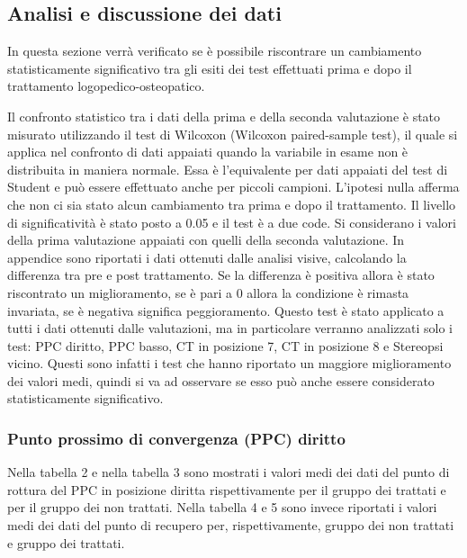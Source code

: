  
 
\subsection{Analisi e discussione dei dati}
 
In questa sezione verrà verificato se è possibile riscontrare un cambiamento statisticamente significativo tra gli esiti dei test effettuati prima e dopo il trattamento logopedico-osteopatico.
 
Il confronto statistico tra i dati della prima e della seconda valutazione è stato misurato utilizzando il test di Wilcoxon (Wilcoxon paired-sample test), il quale si applica nel confronto di dati appaiati quando la variabile in esame non è distribuita in maniera normale. Essa è l’equivalente per dati appaiati del test di Student e può essere effettuato anche per piccoli campioni. L’ipotesi nulla afferma che non ci sia stato alcun cambiamento tra prima e dopo il trattamento. Il livello di significatività è stato posto a 0.05 e il test è a due code. Si considerano i valori della prima valutazione appaiati con quelli della seconda valutazione. In appendice sono riportati i dati ottenuti dalle analisi visive, calcolando la differenza tra pre e post trattamento. Se la differenza è positiva allora è stato riscontrato un miglioramento, se è pari a 0 allora la condizione è rimasta invariata, se è negativa significa peggioramento. Questo test è stato applicato a tutti i dati ottenuti dalle valutazioni, ma in particolare verranno analizzati solo i test: PPC diritto, PPC basso, CT in posizione 7, CT in posizione 8 e Stereopsi vicino. Questi sono infatti i test che hanno riportato un maggiore miglioramento dei valori medi, quindi si va ad osservare se esso può anche essere considerato statisticamente significativo. 
 
 
 
\subsubsection{Punto prossimo di convergenza (PPC) diritto}

Nella tabella 2 e nella tabella 3 sono mostrati i valori medi dei dati del punto di rottura del PPC in posizione diritta rispettivamente per il gruppo dei trattati e per il gruppo dei non trattati. Nella tabella 4 e 5 sono invece riportati i valori medi dei dati del punto di recupero per, rispettivamente, gruppo dei non trattati e gruppo dei trattati.
\\\ 

